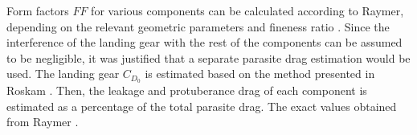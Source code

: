 Form factors $FF$ for various components can be calculated according to Raymer, depending on the relevant geometric parameters and fineness ratio \cite[p. 283]{raymer1992aircraft}. Since the interference of the landing gear with the rest of the components can be assumed to be negligible, it was justified that a separate parasite drag estimation would be used. The landing gear $C_{D_0}$ is estimated based on the method presented in Roskam \cite{roskamVI}. Then, the leakage and protuberance drag of each component is estimated as a percentage of the total parasite drag. The exact values obtained from Raymer \cite{raymer1992aircraft}.

